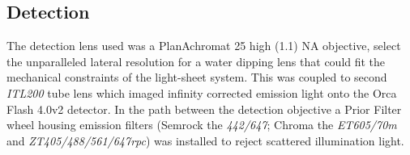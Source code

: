 


\subsection{Detection}

The detection lens used was a PlanAchromat \SI{25}{\times} high (\SI{1.1}{}) \gls{NA} objective, select the unparalleled lateral resolution for a water dipping lens that could fit the mechanical constraints of the \gls{light-sheet} system.
This was coupled to second \emph{ITL200} tube lens which imaged infinity corrected emission light onto the Orca Flash 4.0v2 detector.
In the path between the detection objective a Prior Filter wheel housing emission filters (Semrock the \emph{442/647};
Chroma the \emph{ET605/70m} and \emph{ZT405/488/561/647rpc}) was installed to reject scattered illumination light.


